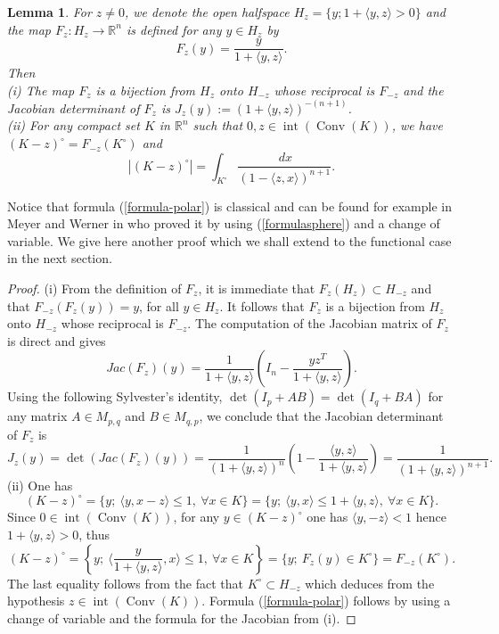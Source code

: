 \documentclass[10pt]{amsart}
\newtheorem{lem}[thm]{Lemma}
\theoremstyle{definition}
\theoremstyle{remark}
\newcommand{\R}{\mathbb{R}}
\newcommand{\conv}{\operatorname{Conv}}
\newcommand{\inte}{\operatorname{int}}
\begin{document}
\begin{lem}\label{homog}
For $z\neq0$, we denote the open halfspace $H_z=\{y;1+\langle y,z\rangle>0\}$ and the map $F_z:H_z\to \R^n$ is defined for any $y\in H_z$ by
\[
F_z(y)=\frac{y}{1+\langle y,z\rangle}.
\]
Then \\
(i) The map $F_z$ is a bijection from $H_z$ onto $H_{-z}$ whose reciprocal is $F_{-z}$ and the Jacobian determinant of $F_z$ is $J_z(y):=(1+\langle y,z\rangle)^{-(n+1)}$.\\
(ii) For any compact set $K$ in $\R^n$ such that $0,z\in \inte(\conv(K))$, we have $(K-z)^\circ=F_{-z}(K^\circ)$ and 
\begin{equation}\label{formula-polar}
|(K-z)^\circ|=\int_{K^\circ}\frac{\,dx}{(1-\langle z,x\rangle)^{n+1}}.
\end{equation}
\end{lem}
Notice that formula (\ref{formula-polar}) is classical and can be found for example in Meyer and Werner in \cite[Lemma 3]{MW98} who proved it by using (\ref{formulasphere}) and a change of variable. We give here another proof which we shall extend to the functional case in the next section.

\begin{proof}
(i) From the definition of $F_z$, it is immediate that $F_z(H_z)\subset H_{-z}$ and that $F_{-z}(F_z(y))=y$, for all $y\in H_z$. It follows that $F_z$ is a bijection from $H_z$ onto $H_{-z}$ whose reciprocal is $F_{-z}$. The computation of the Jacobian matrix of $F_z$ is direct and gives 
\[
Jac(F_z)(y)=\frac{1}{1+\langle y,z\rangle}\left(I_n-\frac{yz^T}{1+\langle y,z\rangle}\right).
\]
Using the following Sylvester's identity, $\det(I_p+AB)=\det(I_q+BA)$ for any matrix $A\in M_{p,q}$ and $B\in M_{q,p}$, we conclude that the Jacobian determinant of $F_z$ is 
\[
J_z(y)=\det(Jac(F_z)(y))=\frac{1}{(1+\langle y,z\rangle)^n}\left(1-\frac{\langle y,z\rangle}{1+\langle y,z\rangle}\right)=\frac{1}{(1+\langle y,z\rangle)^{n+1}}.
\]
(ii)
One has 
\[
(K-z)^\circ=\{y;\ \langle y,x-z\rangle\le1,\ \forall x\in K\}=\{y;\ \langle y,x\rangle\le1+\langle y,z\rangle,\ \forall x\in K\}.
\]
Since $0\in\inte(\conv(K))$, for any $y\in(K-z)^\circ$ one has $\langle y,-z\rangle<1$ hence $1+\langle y,z\rangle>0$, thus
\[
(K-z)^\circ=\left\{y;\ \langle \frac{y}{1+\langle y,z\rangle},x\rangle\le1,\ \forall x\in K\right\}=\{y;\ F_z(y)\in K^\circ\}=F_{-z}(K^\circ).
\]
The last equality follows from the fact that $K^\circ\subset H_{-z}$ which deduces from the hypothesis $z\in\inte(\conv(K))$. Formula (\ref{formula-polar}) follows by using a change of variable and the formula for the Jacobian from (i).
\end{proof}
\end{document}
